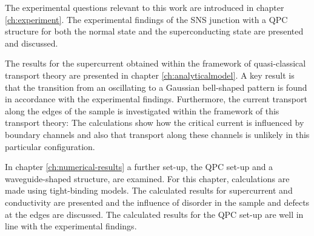 The experimental questions relevant to this work are introduced in chapter \ref{ch:experiment}. The experimental findings of the SNS junction with a QPC structure for both the normal state and the superconducting state are presented and discussed.

The results for the supercurrent obtained within the framework of quasi-classical transport theory are presented in chapter \ref{ch:analyticalmodel}. A key result is that the transition from an oscillating to a Gaussian bell-shaped pattern is found in accordance with the experimental findings. Furthermore, the current transport along the edges of the sample is investigated within the framework of this transport theory: The calculations show how the critical current is influenced by boundary channels and also that transport along these channels is unlikely in this particular configuration.

In chapter \ref{ch:numerical-results} a further set-up, the QPC set-up and a waveguide-shaped structure, are examined. For this chapter, calculations are made using tight-binding models. The calculated results for supercurrent and conductivity are presented and the influence of disorder in the sample and defects at the edges are discussed. The calculated results for the QPC set-up are well in line with the experimental findings.

